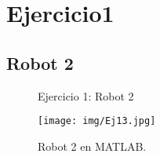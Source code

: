 \section{\textbf{Ejercicio1}}
\subsection{\textbf{Robot 2}}

\begin{figure}[h]
	\centering
	\hfill
	\caption{Ejercicio 1: Robot 2}
	\label{fig:Robots}
\end{figure}

\begin{figure}[H]
	\centering
	\texttt{[image: img/Ej13.jpg]}
	\caption{Robot 2 en MATLAB.}
	\label{fig:Robot2matlab}
\end{figure}